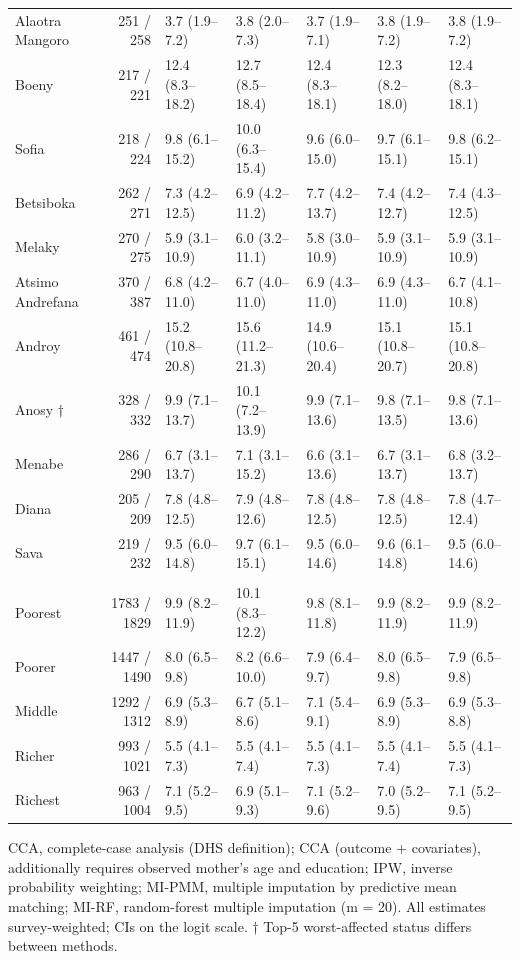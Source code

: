 \begin{longtable}{l|rlllll}
Alaotra Mangoro & 251 / 258 & 3.7 (1.9–7.2) & 3.8 (2.0–7.3) & 3.7 (1.9–7.1) & 3.8 (1.9–7.2) & 3.8 (1.9–7.2) \\ 
Boeny & 217 / 221 & 12.4 (8.3–18.2) & 12.7 (8.5–18.4) & 12.4 (8.3–18.1) & 12.3 (8.2–18.0) & 12.4 (8.3–18.1) \\ 
Sofia & 218 / 224 & 9.8 (6.1–15.2) & 10.0 (6.3–15.4) & 9.6 (6.0–15.0) & 9.7 (6.1–15.1) & 9.8 (6.2–15.1) \\ 
Betsiboka & 262 / 271 & 7.3 (4.2–12.5) & 6.9 (4.2–11.2) & 7.7 (4.2–13.7) & 7.4 (4.2–12.7) & 7.4 (4.3–12.5) \\ 
Melaky & 270 / 275 & 5.9 (3.1–10.9) & 6.0 (3.2–11.1) & 5.8 (3.0–10.9) & 5.9 (3.1–10.9) & 5.9 (3.1–10.9) \\ 
Atsimo Andrefana & 370 / 387 & 6.8 (4.2–11.0) & 6.7 (4.0–11.0) & 6.9 (4.3–11.0) & 6.9 (4.3–11.0) & 6.7 (4.1–10.8) \\ 
Androy & 461 / 474 & 15.2 (10.8–20.8) & 15.6 (11.2–21.3) & 14.9 (10.6–20.4) & 15.1 (10.8–20.7) & 15.1 (10.8–20.8) \\ 
Anosy † & 328 / 332 & 9.9 (7.1–13.7) & 10.1 (7.2–13.9) & 9.9 (7.1–13.6) & 9.8 (7.1–13.5) & 9.8 (7.1–13.6) \\ 
Menabe & 286 / 290 & 6.7 (3.1–13.7) & 7.1 (3.1–15.2) & 6.6 (3.1–13.6) & 6.7 (3.1–13.7) & 6.8 (3.2–13.7) \\ 
Diana & 205 / 209 & 7.8 (4.8–12.5) & 7.9 (4.8–12.6) & 7.8 (4.8–12.5) & 7.8 (4.8–12.5) & 7.8 (4.7–12.4) \\ 
Sava & 219 / 232 & 9.5 (6.0–14.8) & 9.7 (6.1–15.1) & 9.5 (6.0–14.6) & 9.6 (6.1–14.8) & 9.5 (6.0–14.6) \\ 
\midrule\addlinespace[2.5pt]
\multicolumn{7}{l}{Wasting — Wealth quintile} \\[2.5pt] 
\midrule\addlinespace[2.5pt]
Poorest & 1783 / 1829 & 9.9 (8.2–11.9) & 10.1 (8.3–12.2) & 9.8 (8.1–11.8) & 9.9 (8.2–11.9) & 9.9 (8.2–11.9) \\ 
Poorer & 1447 / 1490 & 8.0 (6.5–9.8) & 8.2 (6.6–10.0) & 7.9 (6.4–9.7) & 8.0 (6.5–9.8) & 7.9 (6.5–9.8) \\ 
Middle & 1292 / 1312 & 6.9 (5.3–8.9) & 6.7 (5.1–8.6) & 7.1 (5.4–9.1) & 6.9 (5.3–8.9) & 6.9 (5.3–8.8) \\ 
Richer & 993 / 1021 & 5.5 (4.1–7.3) & 5.5 (4.1–7.4) & 5.5 (4.1–7.3) & 5.5 (4.1–7.4) & 5.5 (4.1–7.3) \\ 
Richest & 963 / 1004 & 7.1 (5.2–9.5) & 6.9 (5.1–9.3) & 7.1 (5.2–9.6) & 7.0 (5.2–9.5) & 7.1 (5.2–9.5) \\ 
\bottomrule
\end{longtable}
\begin{minipage}{\linewidth}
\vspace{.05em}
CCA, complete-case analysis (DHS definition); CCA (outcome + covariates), additionally requires observed mother's age and education; IPW, inverse probability weighting; MI-PMM, multiple imputation by predictive mean matching; MI-RF, random-forest multiple imputation (m = 20). All estimates survey-weighted; CIs on the logit scale. † Top-5 worst-affected status differs between methods.\\
\end{minipage}
\endgroup

